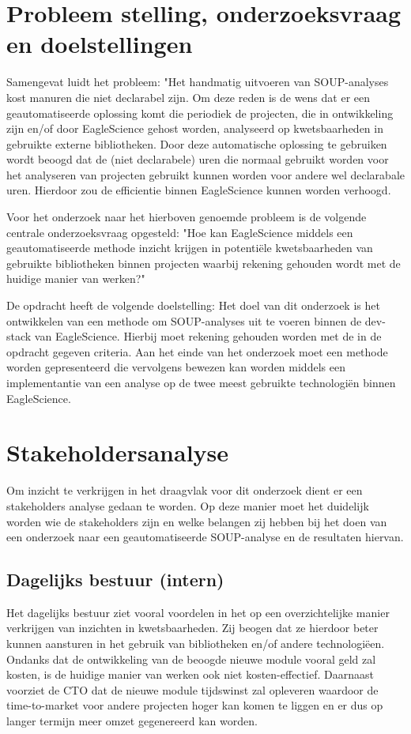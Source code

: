 \section{Probleem stelling, onderzoeksvraag en doelstellingen}\label{sec:probleem-stelling-onderzoeksvraag-en-doelstellingen}
Samengevat luidt het probleem: "Het handmatig uitvoeren van SOUP-analyses kost manuren die niet declarabel zijn. Om deze reden is de wens dat er een geautomatiseerde oplossing komt die periodiek de projecten, die in ontwikkeling zijn en/of door EagleScience gehost worden, analyseerd op kwetsbaarheden in gebruikte externe bibliotheken. Door deze automatische oplossing te gebruiken wordt beoogd dat de (niet declarabele) uren die normaal gebruikt worden voor het analyseren van projecten gebruikt kunnen worden voor andere wel declarabale uren. Hierdoor zou de efficientie binnen EagleScience kunnen worden verhoogd.

Voor het onderzoek naar het hierboven genoemde probleem is de volgende centrale onderzoeksvraag opgesteld: "Hoe kan EagleScience middels een geautomatiseerde methode inzicht krijgen in potentiële kwetsbaarheden van gebruikte bibliotheken binnen projecten waarbij rekening gehouden wordt met de huidige manier van werken?"

De opdracht heeft de volgende doelstelling:
Het doel van dit onderzoek is het ontwikkelen van een methode om SOUP-analyses uit te voeren binnen de dev-stack van EagleScience. Hierbij moet rekening gehouden worden met de in de opdracht gegeven criteria. Aan het einde van het onderzoek moet een methode worden gepresenteerd die vervolgens bewezen kan worden middels een implementantie van een analyse op de twee meest gebruikte technologiën binnen EagleScience.

\section{Stakeholdersanalyse}\label{sec:stakeholdersanalyse}
Om inzicht te verkrijgen in het draagvlak voor dit onderzoek dient er een stakeholders analyse gedaan te worden. Op deze manier moet het duidelijk worden wie de stakeholders zijn en welke belangen zij hebben bij het doen van een onderzoek naar een geautomatiseerde SOUP-analyse en de resultaten hiervan.

\subsection{Dagelijks bestuur (intern)}\label{subsec:dagelijks-bestuur-(intern)1}
Het dagelijks bestuur ziet vooral voordelen in het op een overzichtelijke manier verkrijgen van inzichten in kwetsbaarheden. Zij beogen dat ze hierdoor beter kunnen aansturen in het gebruik van bibliotheken en/of andere technologiëen. Ondanks dat de ontwikkeling van de beoogde nieuwe module vooral geld zal kosten, is de huidige manier van werken ook niet kosten-effectief. Daarnaast voorziet de CTO dat de nieuwe module tijdswinst zal opleveren waardoor de time-to-market voor andere projecten hoger kan komen te liggen en er dus op langer termijn meer omzet gegenereerd kan worden.

